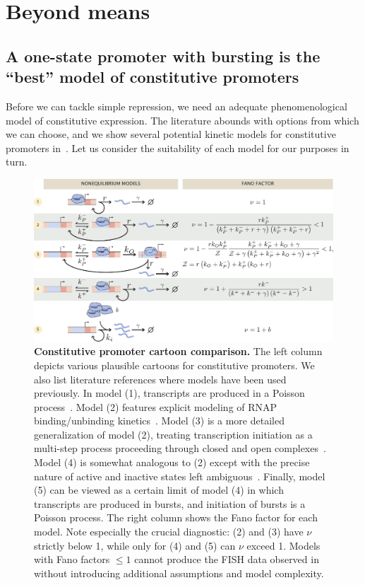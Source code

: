 \section{Beyond means}
\subsection{A one-state promoter with bursting is the ``best'' model of constitutive promoters}
Before we can tackle simple repression, we need an adequate phenomenological
model of constitutive expression. The literature abounds with options from which
we can choose, and we show several potential kinetic models for constitutive
promoters in~. Let us consider the suitability of each
model for our purposes in turn.

\begin{figure}%
\centering
\includegraphics[width=\textwidth]{../figures/main/fig02.pdf}
\caption{\textbf{Constitutive promoter cartoon comparison.}
The left column depicts various plausible cartoons for constitutive promoters.
We also list literature references where models have been used previously. In
model (1), transcripts are produced in a Poisson process~\cite{Jones2014}. Model
(2) features explicit modeling of RNAP binding/unbinding
kinetics~\cite{Phillips2015a}. Model (3) is a more detailed generalization of
model (2), treating transcription initiation as a multi-step process proceeding
through closed and open complexes~\cite{Mitarai2015}. Model (4) is somewhat
analogous to (2) except with the precise nature of active and inactive states
left ambiguous~\cite{Razo-Mejia2020}. Finally, model (5) can be viewed as a
certain limit of model (4) in which transcripts are produced in bursts, and
initiation of bursts is a Poisson process.  The right column shows the
Fano factor for each model. Note especially the crucial diagnostic: (2) and (3)
have $\nu$ strictly below 1, while only for (4) and (5) can $\nu$ exceed 1.
Models with Fano factors $\le 1$ cannot produce the FISH data observed
in~\cite{Jones2014} without introducing additional assumptions and model
complexity.}
\label{fig:constit_cartoons}
\end{figure}


